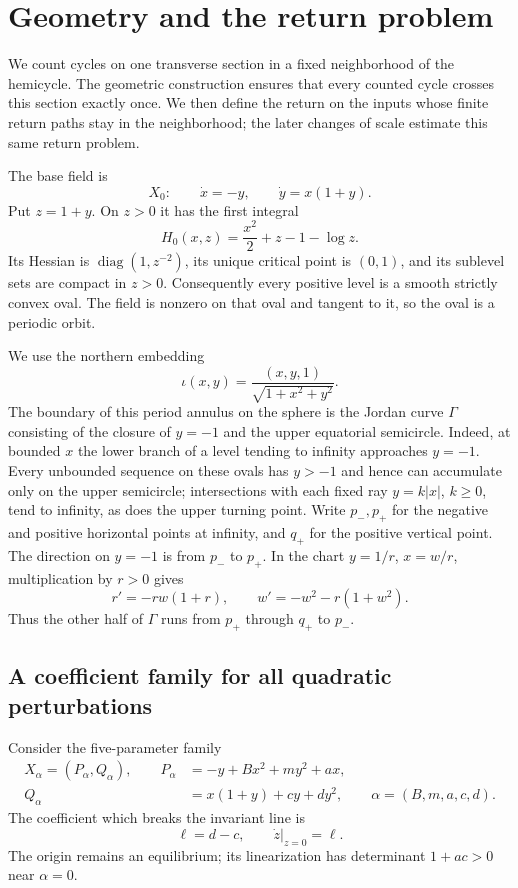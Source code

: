 \section{Geometry and the return problem}\label{rw:geometry}

We count cycles on one transverse section in a fixed neighborhood of
the hemicycle.  The geometric construction ensures that every counted
cycle crosses this section exactly once.  We then define the return
on the inputs whose finite return paths stay in the neighborhood;
the later changes of scale estimate this same return problem.

The base field is
\begin{equation}\label{rw:base-field}
 X_0:\qquad \dot x=-y,\qquad \dot y=x(1+y).
\end{equation}
Put $z=1+y$.  On $z>0$ it has the first integral
\begin{equation}\label{rw:geometry:energy}
 H_0(x,z)=\frac{x^2}{2}+z-1-\log z.
\end{equation}
Its Hessian is $\operatorname{diag}(1,z^{-2})$, its unique critical
point is $(0,1)$, and its sublevel sets are compact in $z>0$.
Consequently every positive level is a smooth strictly convex oval.
The field is nonzero on that oval and tangent to it, so the oval is a
periodic orbit.

We use the northern embedding
\[
 \iota(x,y)=\frac{(x,y,1)}{\sqrt{1+x^2+y^2}}.
\]
The boundary of this period annulus on the sphere is the Jordan curve
$\Gamma$ consisting of the closure of $y=-1$ and the upper equatorial
semicircle.  Indeed, at bounded $x$ the lower branch of a level tending
to infinity approaches $y=-1$.  Every unbounded sequence on these
ovals has $y>-1$ and hence can accumulate only on the upper semicircle;
intersections with each fixed ray $y=k|x|$, $k\ge0$, tend to infinity,
as does the upper turning point.  Write $p_-,p_+$ for the negative and
positive horizontal points at infinity, and $q_+$ for the positive
vertical point.  The direction on $y=-1$ is from $p_-$ to $p_+$.
In the chart $y=1/r$, $x=w/r$, multiplication by $r>0$ gives
\[
 r'=-rw(1+r),\qquad w'=-w^2-r(1+w^2).
\]
Thus the other half of $\Gamma$ runs from $p_+$ through $q_+$ to $p_-$.

\subsection{A coefficient family for all quadratic perturbations}

Consider the five-parameter family
\begin{equation}\label{rw:family}
 \begin{aligned}
 X_\alpha=(P_\alpha,Q_\alpha),\qquad
 P_\alpha&=-y+Bx^2+my^2+ax,\\
 Q_\alpha&=x(1+y)+cy+dy^2,
 \qquad \alpha=(B,m,a,c,d).
 \end{aligned}
\end{equation}
The coefficient which breaks the invariant line is
\begin{equation}\label{rw:geometry:line-breaking}
 \ell=d-c,\qquad \dot z\big|_{z=0}=\ell.
\end{equation}
The origin remains an equilibrium; its linearization has determinant
$1+ac>0$ near $\alpha=0$.

